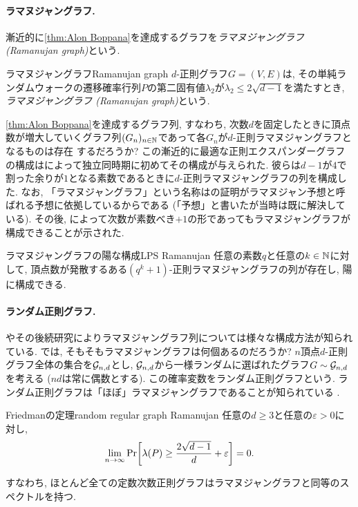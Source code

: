 \paragraph*{ラマヌジャングラフ.}
漸近的に\cref{thm:Alon Boppana}を達成するグラフを\emph{ラマヌジャングラフ (Ramanujan graph)}という.
\begin{definition}{ラマヌジャングラフ}{Ramanujan graph}
    $d$-正則グラフ$G=(V,E)$は, その単純ランダムウォークの遷移確率行列$P$の第二固有値$\lambda_2$が$\lambda_2 \le 2\sqrt{d-1}$を満たすとき, \emph{ラマヌジャングラフ (Ramanujan graph)}という.
\end{definition}

\cref{thm:Alon Boppana}を達成するグラフ列, すなわち,
次数$d$を固定したときに頂点数が増大していくグラフ列$(G_n)_{n\in\mathbb{N}}$であって各$G_n$が$d$-正則ラマヌジャングラフとなるものは存在
するだろうか?
この漸近的に最適な正則エクスパンダーグラフの構成は\citet{LPS88,Mar88}によって独立同時期に初めてその構成が与えられた.
彼らは$d-1$が$4$で割った余りが$1$となる素数であるときに$d$-正則ラマヌジャングラフの列を構成した.
なお, 「ラマヌジャングラフ」という名称は\cite{LPS88}の証明がラマヌジャン予想と呼ばれる予想に依拠しているからである
(「予想」と書いたが当時は既に解決している).
その後, \citet{Mor94}によって次数が素数べき$+1$の形であってもラマヌジャングラフが構成できることが示された.
\begin{theorem}{ラマヌジャングラフの陽な構成}{LPS Ramanujan}
    任意の素数$q$と任意の$k\in\mathbb{N}$に対して, 頂点数が発散するある$(q^k+1)$-正則ラマヌジャングラフの列が存在し, 陽に構成できる.
\end{theorem}

\paragraph*{ランダム正則グラフ.}
\citet{LPS88}やその後続研究によりラマヌジャングラフ列については様々な構成方法が知られている.
では, そもそもラマヌジャングラフは何個あるのだろうか?
$n$頂点$d$-正則グラフ全体の集合を$\mathcal{G}_{n,d}$とし,
$\mathcal{G}_{n,d}$から一様ランダムに選ばれたグラフ$G\sim\mathcal{G}_{n,d}$を考える
($nd$は常に偶数とする).
この確率変数をランダム正則グラフという.
ランダム正則グラフは「ほぼ」ラマヌジャングラフであることが知られている
\cite{Friedman_random_regular}.
\begin{theorem}{Friedmanの定理}{random regular graph Ramanujan}
    任意の$d\ge 3$と任意の$\varepsilon > 0$に対し,
    \[ \lim_{n\to\infty}\Pr\sbra*{\lambda(P) \ge \frac{2\sqrt{d-1}}{d} + \varepsilon} = 0. \]
\end{theorem}
すなわち, ほとんど全ての定数次数正則グラフはラマヌジャングラフと同等のスペクトルを持つ.

